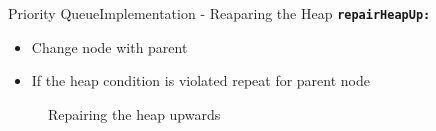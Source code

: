 \begin{frame}{Priority Queue}{Implementation - Reaparing the Heap}
  {\color{Mittel-Blau}\texttt{\textbf{repairHeapUp:}}}
  \begin{itemize}
    \item
      Change node with parent
    \item
      If the {\color{Mittel-Blau}heap condition} is violated repeat for parent
      node
  \end{itemize}
  \begin{center}
    \begin{figure}[!h]%
      \begin{columns}%
        \begin{column}{0.45\linewidth}%
          \begin{adjustbox}{width=\linewidth}%
          \end{adjustbox}%
        \end{column}%
        \begin{column}{0.45\linewidth}%
          \begin{adjustbox}{width=\linewidth}%
          \end{adjustbox}%
        \end{column}%
      \end{columns}%
      \caption{Repairing the heap upwards}%
      \label{fig:priority_queue:impl_repair_heap_up}%
    \end{figure}
  \end{center}
\end{frame}


